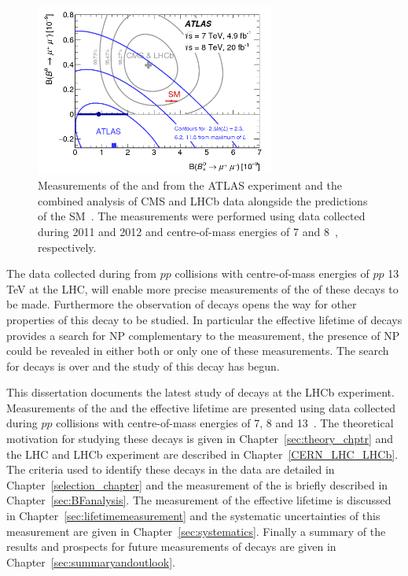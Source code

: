 \begin{figure}[tbp]
    \centering
        \includegraphics[width=0.7\textwidth]{./Figs/Introduction/contour_plot.png}
        \caption{Measurements of the \bdmumu \BF and \bsmumu \BF from the ATLAS experiment and the combined analysis of CMS and LHCb data alongside the predictions of the SM~\cite{Aaboud:2016ire}. The measurements were performed using data collected during 2011 and 2012 and centre-of-mass energies of 7 and 8~\tev, respectively.}
        \label{fig:contour}
\end{figure}

The data collected during from $pp$ collisions with centre-of-mass energies of $pp$ 13 TeV at the LHC, will enable more precise measurements of the \BFs of these decays to be made. 
Furthermore the observation of \bsmumu decays opens the way for other properties of this decay to be studied. In particular the effective lifetime of \bsmumu decays provides a search for NP complementary to the \BF measurement, the presence of NP could be revealed in either both or only one of these measurements. The search for \bsmumu decays is over and the study of this decay has begun.



This dissertation documents the latest study of \bmumu decays at the LHCb experiment. Measurements of the \bmumu \BF and the \bsmumu effective lifetime are presented using data collected during $pp$ collisions with centre-of-mass energies of 7, 8 and 13~\tev. The theoretical motivation for studying these decays is given in Chapter~\ref{sec:theory_chptr} and the LHC and LHCb experiment are described in Chapter~\ref{CERN_LHC_LHCb}. The criteria used to identify these decays in the data are detailed in Chapter~\ref{selection_chapter} and the measurement of the \BF is briefly described in Chapter~\ref{sec:BFanalysis}. The measurement of the \bsmumu effective lifetime is discussed in Chapter~\ref{sec:lifetimemeasurement} and the systematic uncertainties of this measurement are given in Chapter~\ref{sec:systematics}. Finally a summary of the results and prospects for future measurements of \bmumu decays are given in Chapter~\ref{sec:summaryandoutlook}.

